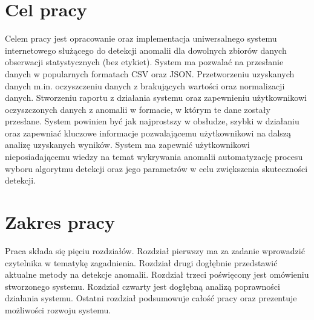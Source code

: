 \section{Cel pracy}
Celem pracy jest opracowanie oraz implementacja uniwersalnego systemu internetowego służącego do detekcji anomalii dla dowolnych zbiorów danych obserwacji statystycznych (bez etykiet). System ma pozwalać na przesłanie danych w popularnych formatach CSV oraz JSON. Przetworzeniu uzyskanych danych m.in. oczyszczeniu danych z brakujących wartości oraz normalizacji danych. Stworzeniu raportu z działania systemu oraz zapewnieniu użytkownikowi oczyszczonych danych z anomalii w formacie, w którym te dane zostały przesłane. System powinien być jak najprostszy w obsłudze, szybki w działaniu oraz zapewniać kluczowe informacje pozwalającemu użytkownikowi na dalszą analizę uzyskanych wyników. 
System ma zapewnić użytkownikowi nieposiadającemu wiedzy na temat wykrywania anomalii automatyzację procesu wyboru algorytmu detekcji oraz jego parametrów w celu zwiększenia skuteczności detekcji.

\section{Zakres pracy}

Praca składa się pięciu rozdziałów. Rozdział pierwszy ma za zadanie wprowadzić czytelnika w tematykę zagadnienia. Rozdział drugi dogłębnie przedstawić aktualne metody na detekcje anomalii. Rozdział trzeci poświęcony jest omówieniu stworzonego systemu. Rozdział czwarty jest dogłębną analizą poprawności działania systemu. Ostatni rozdział podsumowuje całość pracy oraz prezentuje możliwości rozwoju systemu. 